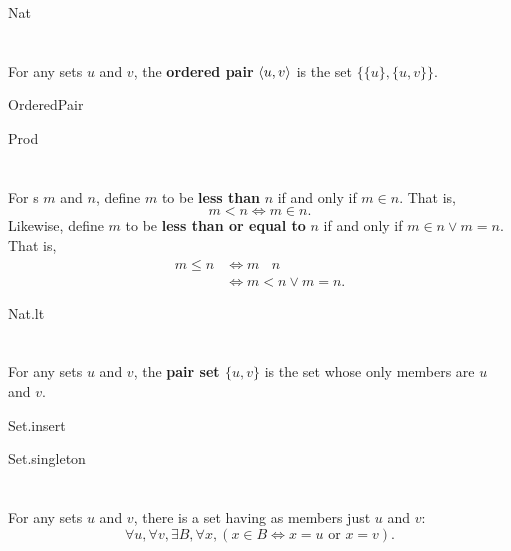 \documentclass{report}
\newcommand{\ineq}{\,\mathop{\underline{\in}}\,}
\begin{document}
    {Nat}

\section{}%

  For any sets $u$ and $v$, the \textbf{ordered pair} $\left< u, v \right>$ is
    the set $\{\{u\}, \{u, v\}\}$.

    {OrderedPair}

    {Prod}

\section{}%

  For s $m$ and $n$, define $m$ to be
    \textbf{less than} $n$ if and only if $m \in n$.
  That is, $$m < n \iff m \in n.$$
  Likewise, define $m$ to be \textbf{less than or equal to} $n$ if and only if
    $m \in n \lor m = n$.
  That is,
    \begin{align*}
      m \leq n
        & \iff m \ineq n \\
        & \iff m < n \lor m = n.
    \end{align*}

    {Nat.lt}

\section{}%

  For any sets $u$ and $v$, the \textbf{pair set $\{u, v\}$} is the set whose
    only members are $u$ and $v$.

    {Set.insert}

    {Set.singleton}

\section{}%

  For any sets $u$ and $v$, there is a set having as members just $u$ and $v$:
    $$\forall u, \forall v, \exists B, \forall x,
        (x \in B \iff x = u \text{ or } x = v).$$
\end{document}
